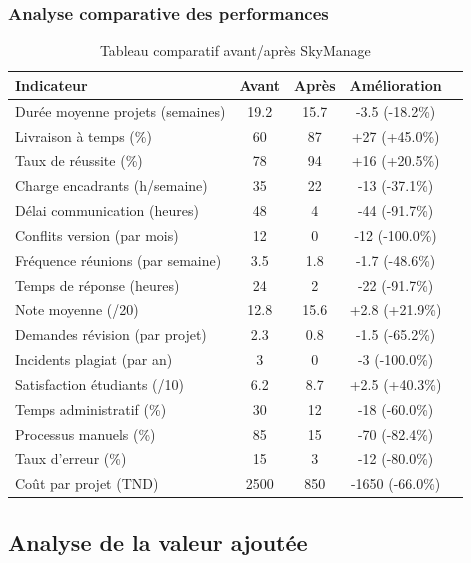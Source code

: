 \subsubsection{Analyse comparative des performances}
\begin{table}[h!]
\centering
\small
\caption{Tableau comparatif avant/après SkyManage}
\label{tab:comparative-analysis}
\begin{tabular}{|l|c|c|c|c|}
\hline
\textbf{Indicateur} & \textbf{Avant} & \textbf{Après} & \textbf{Amélioration} \\
\hline
Durée moyenne projets (semaines) & 19.2 & 15.7 & -3.5 (-18.2\%) \\
\hline
Livraison à temps (\%) & 60 & 87 & +27 (+45.0\%) \\
\hline
Taux de réussite (\%) & 78 & 94 & +16 (+20.5\%) \\
\hline
Charge encadrants (h/semaine) & 35 & 22 & -13 (-37.1\%) \\
\hline
Délai communication (heures) & 48 & 4 & -44 (-91.7\%) \\
\hline
Conflits version (par mois) & 12 & 0 & -12 (-100.0\%) \\
\hline
Fréquence réunions (par semaine) & 3.5 & 1.8 & -1.7 (-48.6\%) \\
\hline
Temps de réponse (heures) & 24 & 2 & -22 (-91.7\%) \\
\hline
Note moyenne (/20) & 12.8 & 15.6 & +2.8 (+21.9\%) \\
\hline
Demandes révision (par projet) & 2.3 & 0.8 & -1.5 (-65.2\%) \\
\hline
Incidents plagiat (par an) & 3 & 0 & -3 (-100.0\%) \\
\hline
Satisfaction étudiants (/10) & 6.2 & 8.7 & +2.5 (+40.3\%) \\
\hline
Temps administratif (\%) & 30 & 12 & -18 (-60.0\%) \\
\hline
Processus manuels (\%) & 85 & 15 & -70 (-82.4\%) \\
\hline
Taux d'erreur (\%) & 15 & 3 & -12 (-80.0\%) \\
\hline
Coût par projet (TND) & 2500 & 850 & -1650 (-66.0\%) \\
\hline
\end{tabular}
\end{table}

\subsection{Analyse de la valeur ajoutée}

